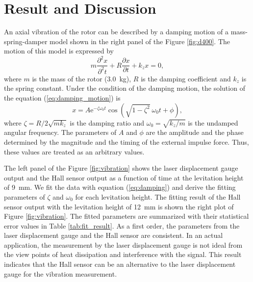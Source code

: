 \documentclass[a4paper]{jpconf}
\begin{document}
\section*{Result and Discussion}

An axial vibration of the rotor can be described by a damping motion of a mass-spring-damper model \cite{mds} shown in the right panel of the Figure \ref{fig:d400}.
The motion of this model is expressed by
\begin{equation}
  m \frac{\partial^{2} x}{\partial^{2} t} + R \frac{\partial x}{\partial t} + k_{z} x = 0,
  \label{eq:damping_motion}
\end{equation}
where $m$ is the mass of the rotor (3.0~kg), $R$ is the damping coefficient and $k_{z}$ is the spring constant.
Under the condition of the damping motion, the solution of the equation (\ref{eq:damping_motion}) is
\begin{equation}
  x = A \mathrm{e}^{- \zeta \omega_{0} t} \cos( \sqrt{1 - \zeta^{2}} \ \omega_{0} t + \phi),
  \label{eq:damping}
\end{equation}
where $\zeta = R / 2 \sqrt{mk_{z}}$ is the damping ratio and $\omega_{0} = \sqrt{k_{z}/m}$ is the undamped angular frequency.
The parameters of $A$ and $\phi$ are the amplitude and the phase determined by the magnitude and the timing of the external impulse force.
Thus, these values are treated as an arbitrary values.

The left panel of the Figure \ref{fig:vibration} shows the laser displacement gauge output and the Hall sensor output as a function of time at the levitation height of 9~mm.
We fit the data with equation (\ref{eq:damping}) and derive the fitting parameters of $\zeta$ and $\omega_{0}$ for each levitation height.
The fitting result of the Hall sensor output with the levitation height of 12~mm is shown the right plot of Figure \ref{fig:vibration}.
The fitted parameters are summarized with their statistical error values in Table \ref{tab:fit_result}.
As a first order, the parameters from the laser displacement gauge and the Hall sensor are consistent.
In an actual application, the measurement by the laser displacement gauge is not ideal from the view points of heat dissipation and interference with the signal.
This result indicates that the Hall sensor can be an alternative to the laser displacement gauge for the vibration measurement.
\end{document}

